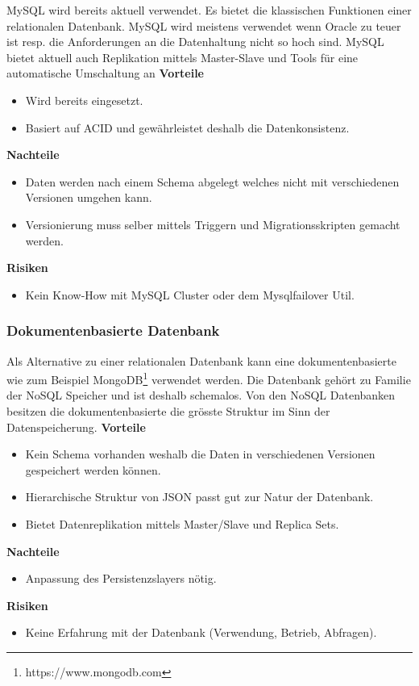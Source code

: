 MySQL wird bereits aktuell verwendet. Es bietet die klassischen Funktionen einer relationalen Datenbank. MySQL wird meistens verwendet wenn Oracle zu teuer ist resp. die Anforderungen an die Datenhaltung nicht so hoch sind. MySQL bietet aktuell auch Replikation mittels Master-Slave und Tools für eine automatische Umschaltung an
\newline
\newline
\textbf{Vorteile}
\begin{itemize}
	\item Wird bereits eingesetzt.
	\item Basiert auf \gls{ACID} und gewährleistet deshalb die Datenkonsistenz.
\end{itemize}
\textbf{Nachteile}
\begin{itemize}
	\item Daten werden nach einem Schema abgelegt welches nicht mit verschiedenen Versionen umgehen kann.
	\item Versionierung muss selber mittels Triggern und Migrationsskripten gemacht werden.
\end{itemize}
\textbf{Risiken}
\begin{itemize}
	\item Kein Know-How mit MySQL Cluster oder dem Mysqlfailover Util.
\end{itemize}

\subsubsection{Dokumentenbasierte Datenbank}

Als Alternative zu einer relationalen Datenbank kann eine dokumentenbasierte wie zum Beispiel MongoDB\footnote{https://www.mongodb.com} verwendet werden. Die Datenbank gehört zu Familie der \Gls{NoSQL} Speicher und ist deshalb schemalos. Von den \gls{NoSQL} Datenbanken besitzen die dokumentenbasierte die grösste Struktur im Sinn der Datenspeicherung.
\newline
\newline
\textbf{Vorteile}
\begin{itemize}
	\item Kein Schema vorhanden weshalb die Daten in verschiedenen Versionen gespeichert werden können.
	\item Hierarchische Struktur von JSON passt gut zur Natur der Datenbank.
	\item Bietet Datenreplikation mittels Master/Slave und Replica Sets.
\end{itemize}
\textbf{Nachteile}
\begin{itemize}
	\item Anpassung des Persistenzslayers nötig.
\end{itemize}
\textbf{Risiken}
\begin{itemize}
	\item Keine Erfahrung mit der Datenbank (Verwendung, Betrieb, Abfragen).
\end{itemize}

